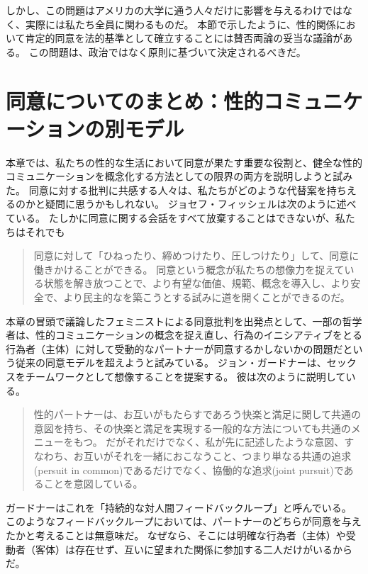 \documentclass[paper=a4,book,openany]{jlreq}
\newcommand{\ig}[1]{}           %
\begin{document}
しかし、この問題はアメリカの大学に通う人々だけに影響を与えるわけではなく、実際には私たち全員に関わるものだ。
本節で示したように、性的関係において肯定的同意を法的基準として確立することには賛否両論の妥当な議論がある。
この問題は、政治ではなく原則に基づいて決定されるべきだ。

\section{同意についてのまとめ：性的コミュニケーションの別モデル}

本章では、私たちの性的な生活において同意が果たす重要な役割と、健全な性的コミュニケーションを概念化する方法としての限界の両方を説明しようと試みた。
同意に対する批判に共感する人々は、私たちがどのような代替案を持ちえるのかと疑問に思うかもしれない。
ジョセフ・フィッシェル\ig{Joseph Fischel}は次のように述べている。
たしかに同意に関する会話をすべて放棄することはできないが、私たちはそれでも

\begin{quote}
同意に対して「ひねったり、締めつけたり、圧しつけたり」して、同意に働きかけることができる。
同意という概念が私たちの想像力を捉えている状態を解き放つことで、より有望な価値、規範、概念を導入し、より安全で、より民主的なを築こうとする試みに道を開くことができるのだ。
\citep[p.3]{fischel18:screwconsent}
\end{quote}

本章の冒頭で議論したフェミニストによる同意批判を出発点として、一部の哲学者は、性的コミュニケーションの概念を捉え直し、行為のイニシアティブをとる行為者（主体）に対して受動的なパートナーが同意するかしないかの問題だという従来の同意モデルを超えようと試みている。
ジョン・ガードナーは、セックスをチームワークとして想像することを提案する。
彼は次のように説明している。

\begin{quote}
性的パートナーは、お互いがもたらすであろう快楽と満足に関して共通の意図を持ち、その快楽と満足を実現する一般的な方法についても共通のメニューをもつ。
だがそれだけでなく、私が先に記述したような意図、すなわち、お互いがそれを一緒におこなうこと、つまり単なる共通の追求(persuit in common)であるだけでなく、協働的な追求(joint pursuit)であることを意図している。
\citep[p.54]{gardner18:_oppos_rape}
\end{quote}

ガードナー\ig{Gardner}はこれを「持続的な対人間フィードバックループ」と呼んでいる\citep[p.55]{gardner18:_oppos_rape}。
このようなフィードバックループにおいては、パートナーのどちらが同意を与えたかと考えることは無意味だ。
なぜなら、そこには明確な行為者（主体）や受動者（客体）は存在せず、互いに望まれた関係に参加する二人だけがいるからだ。
\end{document}
